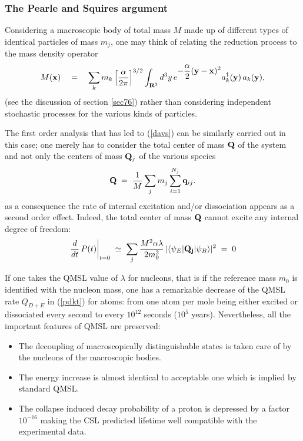 \documentclass[10pt,a4paper]{article}
\begin{document}
\subsubsection{The Pearle and Squires argument} \label{sec1532}

Considering a macroscopic body of total mass $M$ made up of
different types of identical particles of mass $m_{j}$, one may
think of relating the reduction process to the mass density
operator
\begin{equation}
M({\bf x}) \quad = \quad \sum_{k} m_{k}
\left[\frac{\alpha}{2\pi}\right]^{3/2} \int_{{\bf R}^{3}} d^{3}y\,
e^{\displaystyle -\frac{\alpha}{2} ({\bf y} - {\bf x})^{2}}
a^{\dagger}_{k}({\bf y})\, a_{k}({\bf y}),
\end{equation}
(see the discussion of section \ref{sec76}) rather than
considering independent stochastic processes for the various
kinds of particles.

The first order analysis that has led to (\ref{davs}) can be
similarly carried out in this case;  one merely  has to consider
the total center  of mass ${\bf Q}$ of the system and not only the
centers of mass ${\bf Q}_{j}$ of the various species
\begin{equation}
{\bf Q} \;  = \; \frac{1}{M} \sum_{j} m_{j} \sum_{i = 1}^{N_{j}}
{\bf q}_{ij}.
\end{equation}
\noindent as a consequence the rate of internal excitation and/or
dissociation appears as a second order effect. Indeed, the total center
of mass ${\bf Q}$ cannot excite any internal degree of freedom:
\begin{equation}
\left. \frac{d}{dt}\, P(t) \right|_{t = 0} \; \simeq \; \sum_{j}
\frac{M^{2}\alpha\lambda}{2m_{0}^{2}}\, |\langle \psi_{E} | {\bf
Q_{j}} | \psi_{B} \rangle |^{2} \; = \; 0
\end{equation}

If one takes the QMSL value of $\lambda$ for nucleons, that is if the
reference mass $m_{0}$ is identified with the nucleon mass, one
has a remarkable decrease of the QMSL rate $Q_{D+E}$ in
(\ref{pdkt}) for atoms: from one atom per mole being either
excited or dissociated every second to  every $10^{12}$ seconds ($10^{5}$
years). Nevertheless, all the important features of QMSL are preserved:
\begin{itemize}
\item The decoupling of macroscopically distinguishable states is
taken care of by the nucleons of the macroscopic bodies.
\item The energy increase is almost identical to  acceptable
one which is implied by standard QMSL.
\item The collapse induced decay probability of a proton is
depressed by a factor $10^{-16}$ making the CSL predicted lifetime
well compatible with the experimental data.
\end{itemize}
\end{document}
